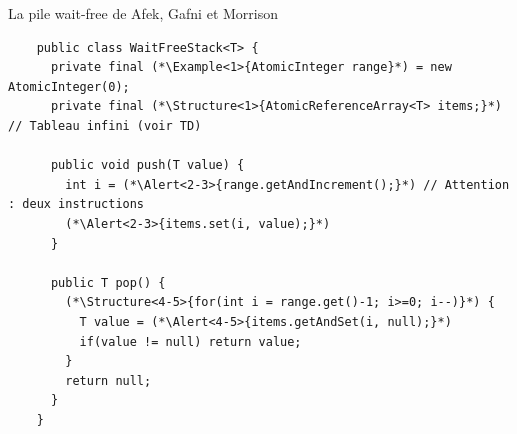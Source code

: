 
\begingroup

\begin{frame}[fragile]{La pile wait-free de Afek, Gafni et Morrison}

  \vspace{-15mm}
  \begin{lstlisting}
    public class WaitFreeStack<T> {
      private final (*\Example<1>{AtomicInteger range}*) = new AtomicInteger(0);
      private final (*\Structure<1>{AtomicReferenceArray<T> items;}*) // Tableau infini (voir TD)

      public void push(T value) {
        int i = (*\Alert<2-3>{range.getAndIncrement();}*) // Attention : deux instructions
        (*\Alert<2-3>{items.set(i, value);}*)
      }

      public T pop() {
        (*\Structure<4-5>{for(int i = range.get()-1; i>=0; i--)}*) {
          T value = (*\Alert<4-5>{items.getAndSet(i, null);}*)
          if(value != null) return value;
        }
        return null;
      }
    }
  \end{lstlisting}


  

\end{frame}

\endgroup
\endinput
